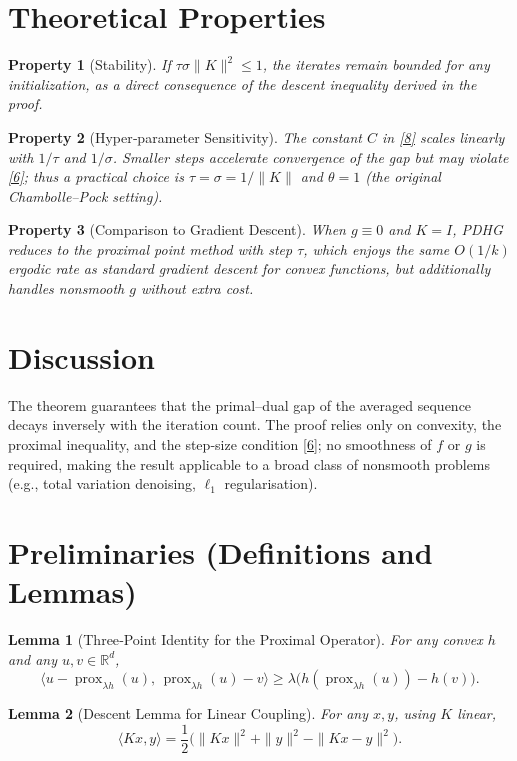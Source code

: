 \documentclass{article}
\newtheorem{lemma}{Lemma}
\newtheorem{property}{Property}
\newcommand{\prox}{\operatorname{prox}}
\newcommand{\ip}[2]{\langle #1,#2\rangle}
\begin{document}
\section*{Theoretical Properties}
\begin{property}[Stability]\label{prop:stab}
If $\tau\sigma\|K\|^{2}\le 1$, the iterates remain bounded for any initialization, as a direct consequence of the descent inequality derived in the proof.
\end{property}
\begin{property}[Hyper‑parameter Sensitivity]\label{prop:hyper}
The constant $C$ in \eqref{8} scales linearly with $1/\tau$ and $1/\sigma$. Smaller steps accelerate convergence of the gap but may violate \eqref{6}; thus a practical choice is $\tau=\sigma=1/\|K\|$ and $\theta=1$ (the original Chambolle–Pock setting).
\end{property}
\begin{property}[Comparison to Gradient Descent]\label{prop:cmp}
When $g\equiv0$ and $K=I$, PDHG reduces to the proximal point method with step $\tau$, which enjoys the same $O(1/k)$ ergodic rate as standard gradient descent for convex functions, but additionally handles nonsmooth $g$ without extra cost.
\end{property}
\section*{Discussion}
The theorem guarantees that the primal–dual gap of the averaged sequence decays inversely with the iteration count. The proof relies only on convexity, the proximal inequality, and the step‑size condition \eqref{6}; no smoothness of $f$ or $g$ is required, making the result applicable to a broad class of nonsmooth problems (e.g., total variation denoising, $\ell_{1}$ regularisation).

\section*{Preliminaries (Definitions and Lemmas)}
\begin{lemma}[Three‑Point Identity for the Proximal Operator]\label{lem:prox}
For any convex $h$ and any $u,v\in\mathbb{R}^{d}$,
\[
\ip{u-\prox_{\lambda h}(u)}{\,\prox_{\lambda h}(u)-v}
\ge \lambda\bigl( h(\prox_{\lambda h}(u))-h(v)\bigr).
\tag{9}
\]
\end{lemma}
\begin{lemma}[Descent Lemma for Linear Coupling]\label{lem:lin}
For any $x,y$, using $K$ linear,
\[
\ip{Kx}{y}= \frac12\bigl(\|Kx\|^{2}+\|y\|^{2}-\|Kx-y\|^{2}\bigr).
\tag{10}
\]
\end{lemma}
\end{document}

